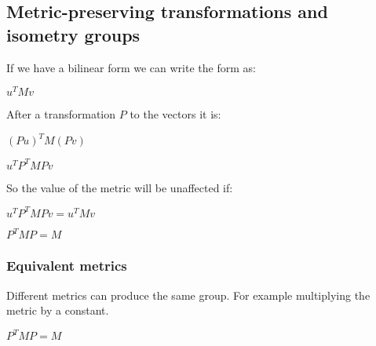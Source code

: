 
\subsection{Metric-preserving transformations and isometry groups}

If we have a bilinear form we can write the form as:

\(u^TMv\)

After a transformation \(P\) to the vectors it is:

\((Pu)^TM(Pv)\)

\(u^TP^TMPv\)

So the value of the metric will be unaffected if:

\(u^TP^TMPv=u^TMv\)

\(P^TMP=M\)

\subsubsection{Equivalent metrics}

Different metrics can produce the same group. For example multiplying the metric by a constant.

\(P^TMP=M\)

